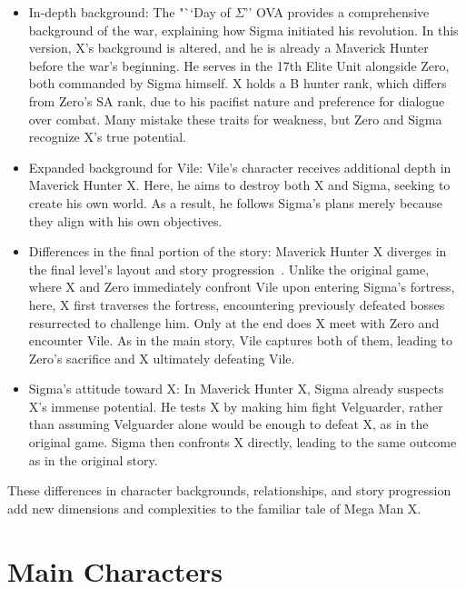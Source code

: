 \begin{itemize}
	
\item In-depth background: The "``Day of $\Sigma$'' OVA provides a comprehensive background of the war, explaining how Sigma initiated his revolution. In this version, X's background is altered, and he is already a Maverick Hunter before the war's beginning. He serves in the 17th Elite Unit alongside Zero, both commanded by Sigma himself. X holds a B hunter rank, which differs from Zero's SA rank, due to his pacifist nature and preference for dialogue over combat. Many mistake these traits for weakness, but Zero and Sigma recognize X's true potential.

\item Expanded background for Vile: Vile's character receives additional depth in Maverick Hunter X. Here, he aims to destroy both X and Sigma, seeking to create his own world. As a result, he follows Sigma's plans merely because they align with his own objectives.

\item Differences in the final portion of the story: Maverick Hunter X diverges in the final level's layout and story progression~\cite{wiki:MM_MHX_script}. Unlike the original game, where X and Zero immediately confront Vile upon entering Sigma's fortress, here, X first traverses the fortress, encountering previously defeated bosses resurrected to challenge him. Only at the end does X meet with Zero and encounter Vile. As in the main story, Vile captures both of them, leading to Zero's sacrifice and X ultimately defeating Vile.

\item Sigma's attitude toward X: In Maverick Hunter X, Sigma already suspects X's immense potential. He tests X by making him fight Velguarder, rather than assuming Velguarder alone would be enough to defeat X, as in the original game. Sigma then confronts X directly, leading to the same outcome as in the original story.

\end{itemize}

These differences in character backgrounds, relationships, and story progression add new dimensions and complexities to the familiar tale of Mega Man X.

\section{Main Characters}

